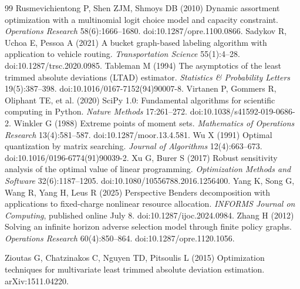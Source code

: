 \documentclass[11pt,letterpaper]{article}
\theoremstyle{definition}\newtheorem{remark}[theorem]{Remark}
\begin{document}
\begin{thebibliography}{99}
Rusmevichientong P, Shen ZJM, Shmoys DB (2010) Dynamic assortment optimization with a multinomial logit choice model and capacity constraint. \emph{Operations Research} 58(6):1666--1680. doi:10.1287/opre.1100.0866.
Sadykov R, Uchoa E, Pessoa A (2021) A bucket graph-based labeling algorithm with application to vehicle routing. \emph{Transportation Science} 55(1):4--28. doi:10.1287/trsc.2020.0985.
Tableman M (1994) The asymptotics of the least trimmed absolute deviations (LTAD) estimator. \emph{Statistics \& Probability Letters} 19(5):387--398. doi:10.1016/0167-7152(94)90007-8.
Virtanen P, Gommers R, Oliphant TE, et al. (2020) SciPy 1.0: Fundamental algorithms for scientific computing in Python. \emph{Nature Methods} 17:261--272. doi:10.1038/s41592-019-0686-2.
Winkler G (1988) Extreme points of moment sets. \emph{Mathematics of Operations Research} 13(4):581--587. doi:10.1287/moor.13.4.581.
Wu X (1991) Optimal quantization by matrix searching. \emph{Journal of Algorithms} 12(4):663--673. doi:10.1016/0196-6774(91)90039-2.
Xu G, Burer S (2017) Robust sensitivity analysis of the optimal value of linear programming. \emph{Optimization Methods and Software} 32(6):1187--1205. doi:10.1080/10556788.2016.1256400.
Yang K, Song G, Wang R, Yang H, Leus R (2025) Perspective Benders decomposition with applications to fixed-charge nonlinear resource allocation. \emph{INFORMS Journal on Computing}, published online July 8. doi:10.1287/ijoc.2024.0984.
Zhang H (2012) Solving an infinite horizon adverse selection model through finite policy graphs. \emph{Operations Research} 60(4):850--864. doi:10.1287/opre.1120.1056.


Zioutas G, Chatzinakos C, Nguyen TD, Pitsoulis L (2015) Optimization techniques for multivariate least trimmed absolute deviation estimation. arXiv:1511.04220.
\end{thebibliography}
\label{refs-end}\clearpage
\end{document}
